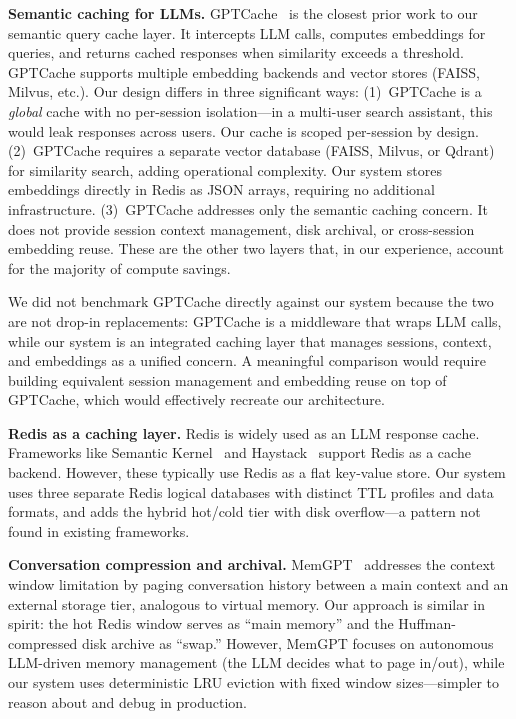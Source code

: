\documentclass[conference]{IEEEtran}
\begin{document}
\textbf{Semantic caching for LLMs.}
GPTCache~\cite{gptcache2023} is the closest prior work to our semantic query cache layer. It intercepts LLM calls, computes embeddings for queries, and returns cached responses when similarity exceeds a threshold. GPTCache supports multiple embedding backends and vector stores (FAISS, Milvus, etc.). Our design differs in three significant ways: (1)~GPTCache is a \emph{global} cache with no per-session isolation---in a multi-user search assistant, this would leak responses across users. Our cache is scoped per-session by design. (2)~GPTCache requires a separate vector database (FAISS, Milvus, or Qdrant) for similarity search, adding operational complexity. Our system stores embeddings directly in Redis as JSON arrays, requiring no additional infrastructure. (3)~GPTCache addresses only the semantic caching concern. It does not provide session context management, disk archival, or cross-session embedding reuse. These are the other two layers that, in our experience, account for the majority of compute savings.

We did not benchmark GPTCache directly against our system because the two are not drop-in replacements: GPTCache is a middleware that wraps LLM calls, while our system is an integrated caching layer that manages sessions, context, and embeddings as a unified concern. A meaningful comparison would require building equivalent session management and embedding reuse on top of GPTCache, which would effectively recreate our architecture.

\textbf{Redis as a caching layer.}
Redis is widely used as an LLM response cache. Frameworks like Semantic Kernel~\cite{semantic_kernel2023} and Haystack~\cite{haystack2023} support Redis as a cache backend. However, these typically use Redis as a flat key-value store. Our system uses three separate Redis logical databases with distinct TTL profiles and data formats, and adds the hybrid hot/cold tier with disk overflow---a pattern not found in existing frameworks.

\textbf{Conversation compression and archival.}
MemGPT~\cite{memgpt2023} addresses the context window limitation by paging conversation history between a main context and an external storage tier, analogous to virtual memory. Our approach is similar in spirit: the hot Redis window serves as ``main memory'' and the Huffman-compressed disk archive as ``swap.'' However, MemGPT focuses on autonomous LLM-driven memory management (the LLM decides what to page in/out), while our system uses deterministic LRU eviction with fixed window sizes---simpler to reason about and debug in production.
\end{document}

